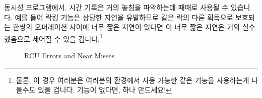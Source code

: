 동시성 프로그램에서, 시간 기록은 거의 놓침을 파악하는데 때때로 사용될 수
있습니다.
예를 들어 락킹 기능은 상당한 지연을 유발하므로 같은 락의 다른 획득으로 보호되는
한쌍의 오퍼레이션 사이에 너무 짧은 지연이 있다면 이 너무 짧은 지연은 거의
실수했음으로 세어질 수 있을 겁니다.\footnote{
	물론, 이 경우 여러분은 여러분의 환경에서 사용 가능한 
	같은 기능을 사용하는게 나을수도 있을 겁니다.
	 기능이 없다면, 하나 만드세요!}

\begin{figure}[tbp]
\centering
{}
\caption{RCU Errors and Near Misses}
\label{fig:debugging:RCU Errors and Near Misses}
\end{figure}

